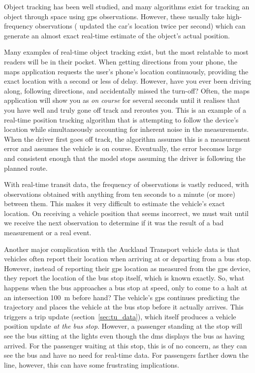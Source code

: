 Object tracking has been well studied, and many algorithms exist for tracking an object through space using \gls{gps} observations. However, these usually take high-frequency observations (\citet{Gustafsson_2002} updated the car's location twice per second) which can generate an almost exact real-time estimate of the object's actual position.


Many examples of real-time object tracking exist, but the most relatable to most readers will be in their pocket. When getting directions from your phone, the maps application requests the user's phone's location continuously, providing the exact location with a second or less of delay. However, have you ever been driving along, following directions, and accidentally missed the turn-off? Often, the maps application will show you as \emph{on course} for several seconds until it realises that you have well and truly gone off track and reroutes you. This is an example of a real-time position tracking algorithm that is attempting to follow the device's location while simultaneously accounting for inherent noise in the measurements. When the driver first goes off track, the algorithm assumes this is a measurement error and assumes the vehicle is on course. Eventually, the error becomes large and consistent enough that the model stops assuming the driver is following the planned route.


With real-time transit data, the frequency of observations is vastly reduced, with observations obtained with anything from ten seconds to a minute (or more) between them. This makes it very difficult to estimate the vehicle's exact location. On receiving a vehicle position that seems incorrect, we must wait until we receive the next observation to determine if it was the result of a bad measurement or a real event.


Another major complication with the Auckland Transport vehicle data is that vehicles often report their location when arriving at or departing from a bus stop. However, instead of reporting their \gls{gps} location as measured from the \gls{gps} device, they report the location of the bus stop itself, which is known exactly. So, what happens when the bus approaches a bus stop at speed, only to come to a halt at an intersection 100~m before hand? The vehicle's \gls{gps} continues predicting the trajectory and places the vehicle at the bus stop before it actually arrives. This triggers a trip update (section~\ref{sec:tu_data}), which itself produces a vehicle position update \emph{at the bus stop}. However, a passenger standing at the stop will see the bus sitting at the lights even though the \gls{dms} displays the bus as having arrived. For the passenger waiting at this stop, this is of no concern, as they can see the bus and have no need for real-time data. For passengers farther down the line, however, this can have some frustrating implications.

